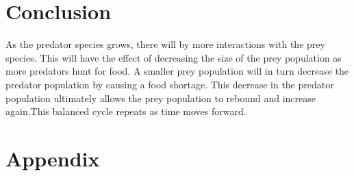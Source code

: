\documentclass[12pt]{article}   %
\theoremstyle{definition}
\numberwithin{equation}{section}
\begin{document}
\setcounter{page}{6}
\section{Conclusion} \label{APPM2360proj01sec01}
\quad As the predator species grows, there will by more interactions with the prey species. This will have the effect of decreasing the size of the prey population as more predators hunt for food. A smaller prey population will in turn decrease the predator population by causing a food shortage. This decrease in the predator population ultimately allows the prey population to rebound and increase again.This balanced cycle repeats as time moves forward.    



\newpage
\setcounter{page}{7}
\section{Appendix} \label{APPM2360proj01sec01}
\end{document}
